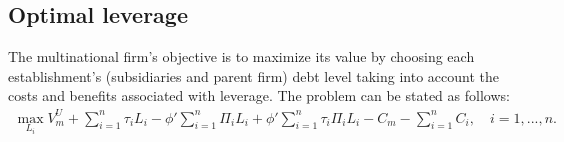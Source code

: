 \documentclass[12pt]{article}
\begin{document}
	\subsection{Optimal leverage}
	\label{subsec:opt_leverage}
	The multinational firm's objective is to maximize its value by choosing each establishment's (subsidiaries and parent firm) debt level taking into account the costs and benefits associated with leverage. The problem can be stated as follows:
	\begin{equation}
	\begin{aligned}
	\max_{L_i}V_m^U+\sum_{i=1}^{n}\tau_iL_i-\phi'\sum_{i=1}^{n}\Pi_iL_i+\phi'\sum_{i=1}^{n}\tau_i\Pi_i L_i-C_m-\sum_{i=1}^{n}C_i, \quad i=1,...,n.
	\end{aligned}
	\label{eq:problem}
	\end{equation}
	
\end{document}
